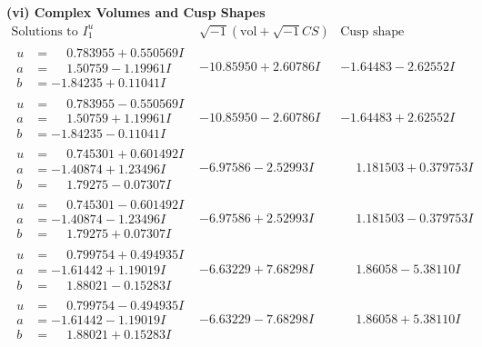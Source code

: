 \documentclass[1p]{elsarticle_modified}
\theoremstyle{definition}
\newcommand{\I}{\sqrt{-1}}
\begin{document}
\newpage\flushleft \textbf{(vi) Complex Volumes and Cusp Shapes}
$$\begin{array}{c|c|c}  
\text{Solutions to }I^u_{1}& \I (\text{vol} + \sqrt{-1}CS) & \text{Cusp shape}\\
 \hline 
\begin{aligned}
u &= \phantom{-}0.783955 + 0.550569 I \\
a &= \phantom{-}1.50759 - 1.19961 I \\
b &= -1.84235 + 0.11041 I\end{aligned}
 & -10.85950 + 2.60786 I & -1.64483 - 2.62552 I \\ \hline\begin{aligned}
u &= \phantom{-}0.783955 - 0.550569 I \\
a &= \phantom{-}1.50759 + 1.19961 I \\
b &= -1.84235 - 0.11041 I\end{aligned}
 & -10.85950 - 2.60786 I & -1.64483 + 2.62552 I \\ \hline\begin{aligned}
u &= \phantom{-}0.745301 + 0.601492 I \\
a &= -1.40874 + 1.23496 I \\
b &= \phantom{-}1.79275 - 0.07307 I\end{aligned}
 & -6.97586 - 2.52993 I & \phantom{-}1.181503 + 0.379753 I \\ \hline\begin{aligned}
u &= \phantom{-}0.745301 - 0.601492 I \\
a &= -1.40874 - 1.23496 I \\
b &= \phantom{-}1.79275 + 0.07307 I\end{aligned}
 & -6.97586 + 2.52993 I & \phantom{-}1.181503 - 0.379753 I \\ \hline\begin{aligned}
u &= \phantom{-}0.799754 + 0.494935 I \\
a &= -1.61442 + 1.19019 I \\
b &= \phantom{-}1.88021 - 0.15283 I\end{aligned}
 & -6.63229 + 7.68298 I & \phantom{-}1.86058 - 5.38110 I \\ \hline\begin{aligned}
u &= \phantom{-}0.799754 - 0.494935 I \\
a &= -1.61442 - 1.19019 I \\
b &= \phantom{-}1.88021 + 0.15283 I\end{aligned}
 & -6.63229 - 7.68298 I & \phantom{-}1.86058 + 5.38110 I \\ \hline\begin{aligned}

\end{aligned}
\end{array}$$
\end{document}
